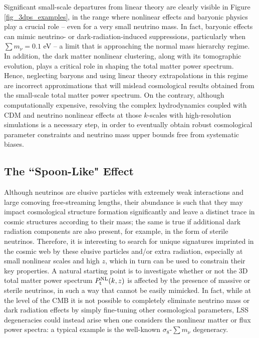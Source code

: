 \documentclass{emulateapj}
\begin{document}
Significant small-scale departures from linear theory are clearly visible in  
Figure \ref{fig_3dps_examples}, in the range where nonlinear effects and baryonic physics play a crucial role 
-- even for a very small neutrino mass. In fact, baryonic effects can  mimic neutrino- or dark-radiation-induced 
suppressions, particularly  when $\sum m_{\nu}=0.1$ eV -- a limit that is 
approaching the normal mass hierarchy regime.
In addition, the dark matter nonlinear clustering, along with its
tomographic evolution, plays a critical role in shaping the total matter power spectrum. 
Hence, neglecting baryons and using linear theory extrapolations in this
regime are incorrect approximations that will mislead cosmological results 
obtained from the small-scale total matter power spectrum. On the contrary, although computationally expensive, resolving the complex hydrodynamics coupled with
CDM and neutrino nonlinear effects at those $k$-scales with high-resolution simulations is a necessary step, in order to eventually obtain 
robust cosmological parameter constraints and neutrino mass upper bounds free from systematic biases. 
 

\subsection{The ``Spoon-Like" Effect}

Although neutrinos are elusive particles with extremely weak interactions and  large
comoving free-streaming lengths, their abundance is such that they 
may  impact   cosmological structure formation significantly and leave a 
distinct trace in cosmic structures according to their mass; the same is true if  
additional dark radiation components are also present, for example, in the form of sterile neutrinos.
Therefore, 
it is interesting   
to search for unique signatures imprinted in the cosmic web by these elusive particles and/or extra radiation,
especially at small nonlinear scales and high $z$,
which in turn
can be used to constrain their key properties. 
A natural starting point is  to investigate whether or not the 
3D total matter power spectrum  $P^{\rm NL}_{\rm t}(k,z)$ is affected by the presence of massive or sterile neutrinos, in 
such a way that cannot be easily mimicked. 
In fact, while at the level of the CMB it is not possible
to completely eliminate neutrino mass or dark radiation effects by simply fine-tuning other cosmological parameters, 
LSS degeneracies
could instead arise when one considers the nonlinear matter or flux power spectra: 
a typical example is the well-known $\sigma_8$-$\sum m_{\nu}$ degeneracy.
\end{document}
